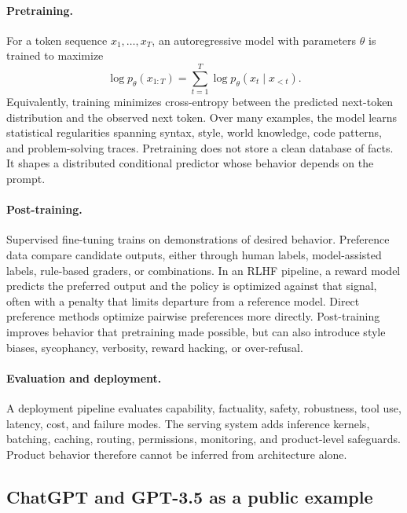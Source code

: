 \documentclass[11pt,a4paper]{article}
\begin{document}
\paragraph{Pretraining.}
For a token sequence $x_1,\ldots,x_T$, an autoregressive model with parameters $\theta$ is trained to maximize
\begin{equation}
  \log p_{\theta}(x_{1:T}) = \sum_{t=1}^{T} \log p_{\theta}(x_t \mid x_{<t}).
\end{equation}
Equivalently, training minimizes cross-entropy between the predicted next-token distribution and the observed next token. Over many examples, the model learns statistical regularities spanning syntax, style, world knowledge, code patterns, and problem-solving traces. Pretraining does not store a clean database of facts. It shapes a distributed conditional predictor whose behavior depends on the prompt.

\paragraph{Post-training.}
Supervised fine-tuning trains on demonstrations of desired behavior. Preference data compare candidate outputs, either through human labels, model-assisted labels, rule-based graders, or combinations. In an RLHF pipeline, a reward model predicts the preferred output and the policy is optimized against that signal, often with a penalty that limits departure from a reference model. Direct preference methods optimize pairwise preferences more directly. Post-training improves behavior that pretraining made possible, but can also introduce style biases, sycophancy, verbosity, reward hacking, or over-refusal.

\paragraph{Evaluation and deployment.}
A deployment pipeline evaluates capability, factuality, safety, robustness, tool use, latency, cost, and failure modes. The serving system adds inference kernels, batching, caching, routing, permissions, monitoring, and product-level safeguards. Product behavior therefore cannot be inferred from architecture alone.

\subsection{ChatGPT and GPT-3.5 as a public example}\label{sec:chatgpt-example}
\end{document}

